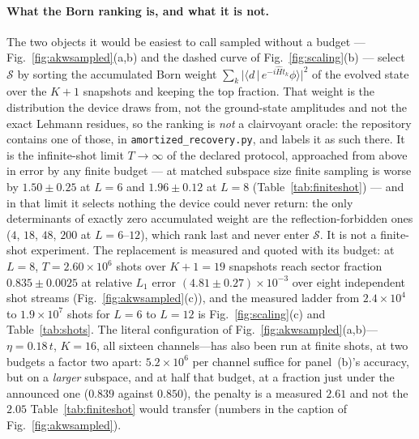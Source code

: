 \paragraph{What the Born ranking is, and what it is not.} The two objects it would be easiest to call
sampled without a budget --- Fig.~\ref{fig:akwsampled}(a,b) and the dashed curve of
Fig.~\ref{fig:scaling}(b) --- select $\mathcal S$ by sorting the accumulated Born weight
$\sum_{k}|\langle d\,|\,e^{-i\hat Ht_k}\phi\rangle|^{2}$ of the evolved state over the $K{+}1$ snapshots
and keeping the top fraction. That weight is the distribution the device draws from, not the
ground-state amplitudes and not the exact Lehmann residues, so the ranking is \emph{not} a clairvoyant
oracle: the repository contains one of those, in \texttt{amortized\_recovery.py}, and labels it as such
there. It is the infinite-shot limit $T\to\infty$ of the declared protocol, approached from above in
error by any finite budget --- at matched subspace size finite sampling is worse by $1.50\pm0.25$ at
$L=6$ and $1.96\pm0.12$ at $L=8$ (Table~\ref{tab:finiteshot}) --- and in that limit it selects nothing
the device could never return: the only determinants of exactly zero accumulated weight are the reflection-forbidden ones ($4$, $18$, $48$, $200$ at $L=6$--$12$), which rank last and never enter $\mathcal S$. It is not a
finite-shot experiment. The
replacement is measured and quoted with its budget: at $L=8$, $T=2.60\times10^{6}$ shots over $K{+}1=19$
snapshots reach sector fraction $0.835\pm0.0025$ at relative $L_1$ error $(4.81\pm0.27)\times10^{-3}$
over eight independent shot streams (Fig.~\ref{fig:akwsampled}(c)), and the measured ladder from
$2.4\times10^{4}$ to $1.9\times10^{7}$ shots for $L=6$ to $L=12$ is Fig.~\ref{fig:scaling}(c) and
Table~\ref{tab:shots}. The literal configuration of Fig.~\ref{fig:akwsampled}(a,b)---$\eta=0.18\,t$,
$K=16$, all sixteen channels---has also been run at finite shots, at two budgets a factor two apart: $5.2\times10^{6}$ per channel suffice
for panel~(b)'s accuracy, but on a \emph{larger} subspace, and at half that budget, at a fraction just under
the announced one ($0.839$ against $0.850$), the penalty is a measured $2.61$ and not the $2.05$
Table~\ref{tab:finiteshot} would transfer (numbers in the caption of Fig.~\ref{fig:akwsampled}).

